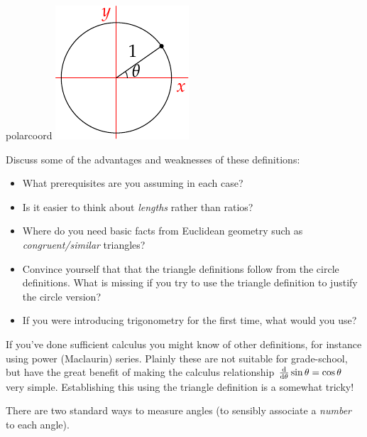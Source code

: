 \begin{defn}[lower separated=false, sidebyside, sidebyside align=top seam, sidebyside gap=0pt, righthand width=0.28\linewidth]{}{polarcoord}
	\includegraphics{defn-trig3}\phantom{bobo}
\end{defn}

Discuss some of the advantages and weaknesses of these definitions:
\begin{itemize}
  \item What prerequisites are you assuming in each case?
  \item Is it easier to think about \emph{lengths} rather than ratios?
  \item Where do you need basic facts from Euclidean geometry such as \emph{congruent/similar} triangles?
  \item Convince yourself that that the triangle definitions follow from the circle definitions. What is missing if you try to use the triangle definition to justify the circle version?
  \item If you were introducing trigonometry for the first time, what would you use?
\end{itemize}
If you've done sufficient calculus you might know of other definitions, for instance using power (Maclaurin) series. Plainly these are not suitable for grade-school, but have the great benefit of making the calculus relationship $\frac{\mathrm{d} }{\mathrm{d} \theta}\sin\theta=\cos\theta$ very simple. Establishing this using the triangle definition is a somewhat tricky!



There are two standard ways to measure angles (to sensibly associate a \emph{number} to each angle).

